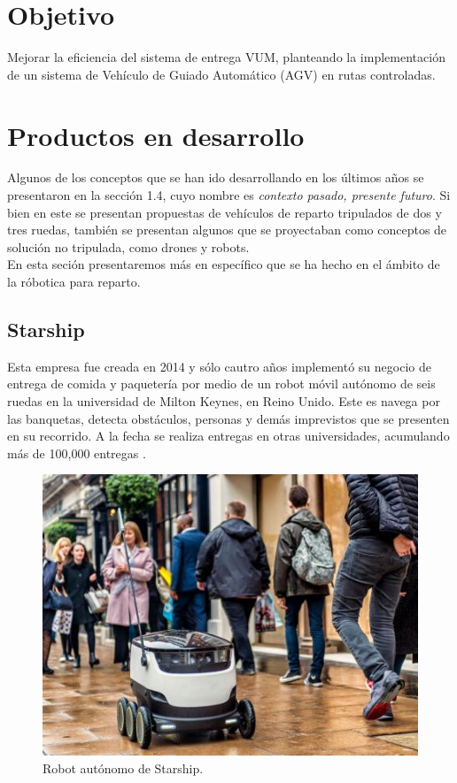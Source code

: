 \section{Objetivo}

Mejorar la eficiencia del sistema de entrega VUM, planteando la implementación de un sistema de Vehículo de Guiado Automático (AGV) en rutas controladas.

\section{Productos en desarrollo}

Algunos de los conceptos que se han ido desarrollando en los últimos años se presentaron en la sección 1.4, cuyo nombre es \textit{contexto pasado, presente futuro}. Si bien en este se presentan propuestas de vehículos de reparto tripulados de dos y tres ruedas, también se presentan algunos que se proyectaban como conceptos de solución no tripulada, como drones y robots. \\
En esta seción presentaremos más en específico que se ha hecho en el ámbito de la róbotica para reparto.

\subsection{Starship} 
Esta empresa fue creada en 2014 y sólo cautro años implementó su negocio de entrega de comida y paquetería por medio de un robot móvil autónomo de seis ruedas en la universidad de Milton Keynes, en Reino Unido. Este es navega por las banquetas, detecta obstáculos, personas y demás imprevistos que se presenten en su recorrido. A la fecha se realiza entregas en otras universidades, acumulando más de 100,000 entregas \cite{starship}.
	\begin{figure}[hbtp]

	\centering
	\includegraphics[scale=0.6]{Figures/Starship_Picture.jpg}
	\caption{Robot autónomo de Starship\cite{starship_picture}.} 
	\end{figure}

